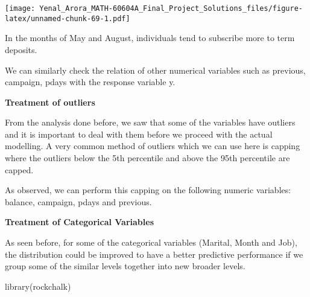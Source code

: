 \documentclass[
]{article}
\newenvironment{Shaded}{\begin{snugshade}}{\end{snugshade}}
\newcommand{\AttributeTok}[1]{\textcolor[rgb]{0.77,0.63,0.00}{#1}}
\newcommand{\FunctionTok}[1]{\textcolor[rgb]{0.00,0.00,0.00}{#1}}
\newcommand{\NormalTok}[1]{#1}
\newcommand{\OtherTok}[1]{\textcolor[rgb]{0.56,0.35,0.01}{#1}}
\newcommand{\SpecialCharTok}[1]{\textcolor[rgb]{0.00,0.00,0.00}{#1}}
\newcommand{\StringTok}[1]{\textcolor[rgb]{0.31,0.60,0.02}{#1}}
\begin{document}
\texttt{[image: Yenal\_Arora\_MATH-60604A\_Final\_Project\_Solutions\_files/figure-latex/unnamed-chunk-69-1.pdf]}

In the months of May and August, individuals tend to subscribe more to
term deposits.

We can similarly check the relation of other numerical variables such as
previous, campaign, pdays with the response variable y.

\textbf{Treatment of outliers}

From the analysis done before, we saw that some of the variables have
outliers and it is important to deal with them before we proceed with
the actual modelling. A very common method of outliers which we can use
here is capping where the outliers below the 5th percentile and above
the 95th percentile are capped.

As observed, we can perform this capping on the following numeric
variables: balance, campaign, pdays and previous.

\begin{Shaded}
\end{Shaded}

\textbf{Treatment of Categorical Variables}

As seen before, for some of the categorical variables (Marital, Month
and Job), the distribution could be improved to have a better predictive
performance if we group some of the similar levels together into new
broader levels.

\begin{Shaded}
\begin{Highlighting}[]
\FunctionTok{library}\NormalTok{(rockchalk)}
\end{Highlighting}
\end{Shaded}
\end{document}
